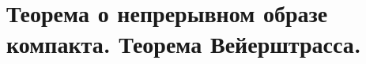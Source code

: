 \documentclass[../main.tex]{subfiles}
\begin{document}
\newpage
\section{Теорема о непрерывном образе компакта. Теорема Вейерштрасса.}
\end{document}
